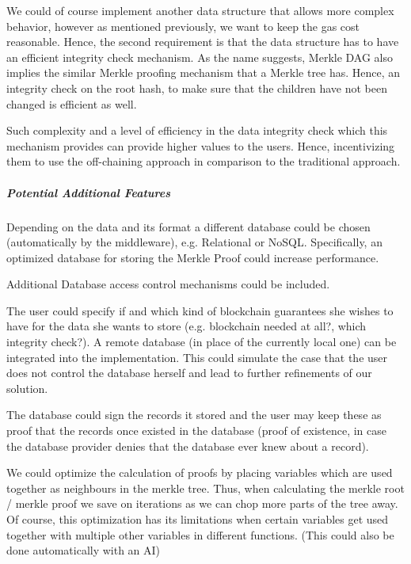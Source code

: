 We could of course implement another data structure that allows more complex behavior, however as mentioned previously, we want to keep the gas cost reasonable. Hence, the second requirement is that the data structure has to have an efficient integrity check mechanism. As the name suggests, Merkle DAG also implies the similar Merkle proofing mechanism that a Merkle tree has. Hence, an integrity check on the root hash, to make sure that the children have not been changed is efficient as well.

Such complexity and a level of efficiency in the data integrity check which this mechanism provides can provide higher values to the users. Hence, incentivizing them to use the off-chaining approach in comparison to the traditional approach.

\subparagraph{Potential Additional Features}
Depending on the data and its format a different database could be chosen (automatically by the middleware), e.g. Relational or NoSQL. Specifically, an optimized database for storing the Merkle Proof could increase performance.

Additional Database access control mechanisms could be included.

The user could specify if and which kind of blockchain guarantees she wishes to have for the data she wants to store (e.g. blockchain needed at all?, which integrity check?).
A remote database (in place of the currently local one) can be integrated into the implementation. This could simulate the case that the user does not control the database herself and lead to further refinements of our solution.

The database could sign the records it stored and the user may keep these as proof that the records once existed in the database (proof of existence, in case the database provider denies that the database ever knew about a record). \cite{Eberhardt}

We could optimize the calculation of proofs by placing variables which are used together as neighbours in the merkle tree. Thus, when calculating the merkle root / merkle proof we save on iterations as we can chop more parts of the tree away. Of course, this optimization has its limitations when certain variables get used together with multiple other variables in different functions. (This could also be done automatically with an AI)
